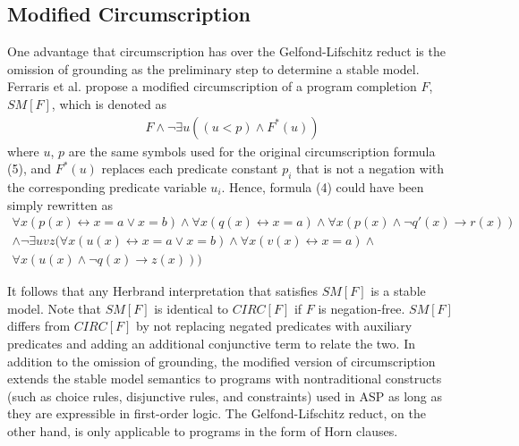 \subsection{Modified Circumscription}
One advantage that circumscription has over the Gelfond-Lifschitz reduct 
is the omission of grounding as the preliminary step to determine a stable 
model. Ferraris et al. \cite{lee} propose a modified circumscription of 
a program completion $F$, $SM[F]$, which is denoted as 
\begin{align}
    F \land \neg \exists u((u < p) \land F^*(u)) 
\end{align}
where $u$, $p$ are the same symbols used for the original circumscription formula (5), 
and $F^*(u)$ 
replaces each predicate constant $p_i$ that is not a negation with 
the corresponding predicate variable $u_i$. Hence, formula (4) could 
have been simply rewritten as 
\begin{multline*}
    \forall x (p(x) \leftrightarrow x = a \lor x = b) \land 
    \forall x (q(x) \leftrightarrow x = a) \land 
    \forall x (p(x) \land \neg q'(x) \rightarrow r(x)) \\ 
    \land \neg \exists uvz (
        \forall x (u(x) \leftrightarrow x = a \lor x = b) \land 
        \forall x (v(x) \leftrightarrow x = a) \land 
        \\ \forall x (u(x) \land \neg q(x) \rightarrow z(x)) 
    ) 
\end{multline*}

It follows 
that any Herbrand interpretation that satisfies $SM[F]$ is a stable model. 
Note that $SM[F]$ is identical to $CIRC[F]$ if $F$ is negation-free. 
$SM[F]$ differs from $CIRC[F]$ by not replacing  
negated predicates with auxiliary predicates and adding an additional 
conjunctive term to relate the two. In addition to the omission of 
grounding, the modified version of circumscription 
extends the stable model semantics to programs with nontraditional constructs 
(such as choice rules, disjunctive rules, and constraints) used in ASP as 
long as they are expressible in first-order logic. The Gelfond-Lifschitz reduct, 
on the other hand, is only applicable to programs in the form of Horn clauses.

